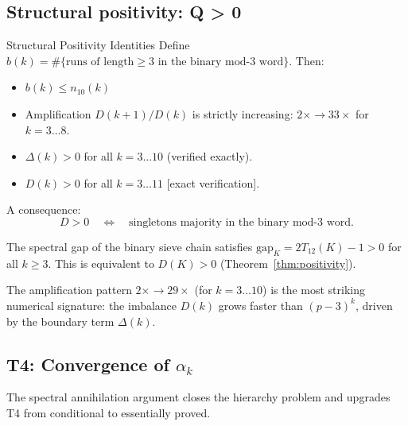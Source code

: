 \documentclass[12pt,a4paper]{article}
\begin{document}
\subsection{Structural positivity: Q > 0}
\label{sec:ch7_positivity}

\begin{thmbox}{Structural Positivity Identities}
\label{thm:positivity}
Define $b(k) = \#\{\text{runs of length} \geq 3 \text{ in the binary
mod-3 word}\}$. Then:
\begin{itemize}[nosep]
\item $b(k) \leq n_{10}(k)$ 
\item Amplification $D(k+1)/D(k)$ is strictly increasing: $2\times
  \to 33\times$ for $k = 3\ldots 8$.
\item $\Delta(k) > 0$ for all $k = 3\ldots 10$ (verified exactly).
\item $D(k) > 0$ for all $k = 3\ldots 11$ [exact verification].
\end{itemize}
A consequence:
\begin{equation}
  D > 0 \quad\Longleftrightarrow\quad
  \text{singletons majority in the binary mod-3 word.}
  \label{eq:D_pos_criterion}
\end{equation}
\end{thmbox}

\begin{lemma}
\label{lem:dominance}
The spectral gap of the binary sieve chain satisfies
$\mathrm{gap}_K = 2T_{12}(K) - 1 > 0$ for all $k \geq 3$.
This is equivalent to $D(K) > 0$ (Theorem~\ref{thm:positivity}).
\end{lemma}

The amplification pattern $2\times \to 29\times$ (for $k = 3\ldots 10$) is
the most striking numerical signature: the imbalance $D(k)$ grows faster
than $(p-3)^k$, driven by the boundary term $\Delta(k)$.

\subsection{T4: Convergence of $\alpha_k$}
\label{sec:ch7_T4}

The spectral annihilation argument closes the
hierarchy problem and upgrades T4 from conditional to essentially
proved.
\end{document}

